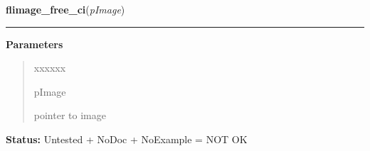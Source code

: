     \label{xformslib:library:flimage_free_ci}

    \vspace{0.5ex}

\hspace{.8\funcindent}\begin{boxedminipage}{\funcwidth}

    \raggedright \textbf{flimage\_free\_ci}(\textit{pImage})

    \vspace{-1.5ex}

    \rule{\textwidth}{0.5\fboxrule}
\setlength{\parskip}{2ex}
\setlength{\parskip}{1ex}
      \textbf{Parameters}
      \vspace{-1ex}

      \begin{quote}
        \begin{Ventry}{xxxxxx}

          \item[pImage]

          pointer to image

        \end{Ventry}

      \end{quote}

\textbf{Status:} Untested + NoDoc + NoExample = NOT OK



    \end{boxedminipage}

    \label{xformslib:library:flimage_free_gray}

    \vspace{0.5ex}


